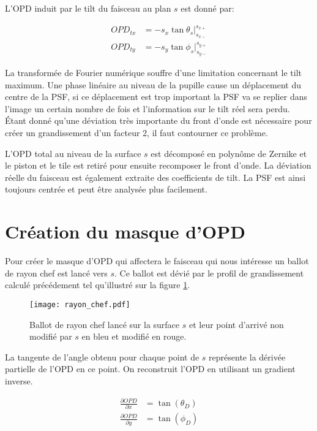 \documentclass[a4paper,10pt]{article}
\numberwithin{equation}{section}
\numberwithin{figure}{section}
\numberwithin{table}{section}
\begin{document}
L'OPD induit par le tilt du faisceau au plan $s$ est donné par:

\begin{align}
	OPD_{tx} &= -s_x \tan{\theta_s} |_{s_{x-}}^{s_{x+}} \\
	OPD_{ty} &= -s_y \tan{\phi_s} |_{s_{y-}}^{s_{y+}}
\end{align}

La transformée de Fourier numérique souffre d'une limitation concernant le tilt maximum. Une phase linéaire au niveau de la pupille cause un déplacement du centre de la PSF, si ce déplacement est trop important la PSF va se replier dans l'image un certain nombre de fois et l'information sur le tilt réel sera perdu. Étant donné qu'une déviation très importante du front d'onde est nécessaire pour créer un grandissement d'un facteur 2, il faut contourner ce problème.

L'OPD total au niveau de la surface $s$ est décomposé en polynôme de Zernike et le piston et le tile est retiré pour ensuite recomposer le front d'onde. La déviation réelle du faisceau est également extraite des coefficients de tilt. La PSF est ainsi toujours centrée et peut être analysée plus facilement.

\section{Création du masque d'OPD}

Pour créer le masque d'OPD qui affectera le faisceau qui nous intéresse un ballot de rayon chef est lancé vers $s$. Ce ballot est dévié par le profil de grandissement calculé précédement tel qu'illustré sur la figure \ref{fig:rayon_chef}. 

\begin{figure}[ht]
	\centering
	\texttt{[image: rayon\_chef.pdf]}
	\caption{Ballot de rayon chef lancé sur la surface $s$ et leur point d'arrivé non modifié par $s$ en bleu et modifié en rouge.}
	\label{fig:rayon_chef}
\end{figure}

La tangente de l'angle obtenu pour chaque point de $s$ représente la dérivée partielle de l'OPD en ce point. On reconstruit l'OPD en utilisant un gradient inverse.

\begin{align}
	\frac{\partial OPD}{\partial x} &= \tan(\theta_D) \\
	\frac{\partial OPD}{\partial y} &= \tan(\phi_D)
\end{align}
\end{document}
